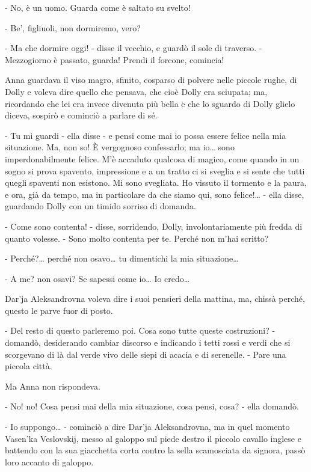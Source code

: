 - No, è un uomo. Guarda come è saltato su svelto! 

- Be', figliuoli, non dormiremo, vero? 

- Ma che dormire oggi! - disse il vecchio, e guardò il sole di traverso. - Mezzogiorno è passato, guarda! Prendi il forcone, comincia! 

Anna guardava il viso magro, sfinito, cosparso di polvere nelle piccole rughe, di Dolly e voleva dire quello che pensava, che cioè Dolly era sciupata; ma, ricordando che lei era invece divenuta più bella e che lo sguardo di Dolly glielo diceva, sospirò e cominciò a parlare di sé. 

- Tu mi guardi - ella disse - e pensi come mai io possa essere felice nella mia situazione. Ma, non so! È vergognoso confessarlo; ma io\ldots{} sono imperdonabilmente felice. M'è accaduto qualcosa di magico, come quando in un sogno si prova spavento, impressione e a un tratto ci si sveglia e si sente che tutti quegli spaventi non esistono. Mi sono svegliata. Ho vissuto il tormento e la paura, e ora, già da tempo, ma in particolare da che siamo qui, sono felice!\ldots{} - ella disse, guardando Dolly con un timido sorriso di domanda. 

- Come sono contenta! - disse, sorridendo, Dolly, involontariamente più fredda di quanto volesse. - Sono molto contenta per te. Perché non m'hai scritto? 

- Perché?\ldots{} perché non osavo\ldots{} tu dimentichi la mia situazione\ldots{} 

- A me? non osavi? Se sapessi come io\ldots{} Io credo\ldots{} 

Dar'ja Aleksandrovna voleva dire i suoi pensieri della mattina, ma, chissà perché, questo le parve fuor di posto. 

- Del resto di questo parleremo poi. Cosa sono tutte queste costruzioni? - domandò, desiderando cambiar discorso e indicando i tetti rossi e verdi che si scorgevano di là dal verde vivo delle siepi di acacia e di serenelle. - Pare una piccola città. 

Ma Anna non rispondeva. 

- No! no! Cosa pensi mai della mia situazione, cosa pensi, cosa? - ella domandò. 

- Io suppongo\ldots{} - cominciò a dire Dar'ja Aleksandrovna, ma in quel momento Vasen'ka Veslovskij, messo al galoppo sul piede destro il piccolo cavallo inglese e battendo con la sua giacchetta corta contro la sella scamosciata da signora, passò loro accanto di galoppo. 

